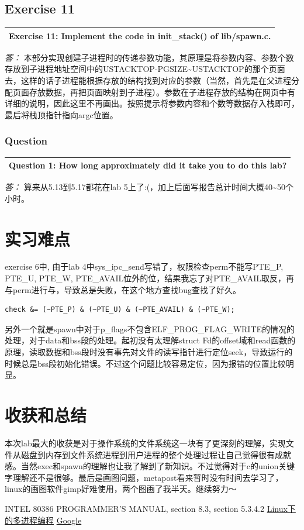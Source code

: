 \documentclass[11pt,a4paper]{article}
\newcommand{\exercise}[2]{
\begin{tabular}{|p{\textwidth}|}
\hline
#1: #2\\
\hline
\end{tabular}
\textit{\large{答：}}}
\begin{document}
\subsection{Exercise 11}
\exercise{Exercise 11}{Implement the code in init\_stack() of lib/spawn.c.}
本部分实现创建子进程时的传递参数功能，其原理是将参数内容、参数个数存放到子进程地址空间中的USTACKTOP-PGSIZE\~{}USTACKTOP的那个页面去，这样的话子进程能根据存放的结构找到对应的参数（当然，首先是在父进程分配页面存放数据，再把页面映射到子进程）。参数在子进程存放的结构在网页中有详细的说明，因此这里不再画出。按照提示将参数内容和个数等数据存入栈即可，最后将栈顶指针指向argc位置。\\

\subsubsection{Question}
\exercise{Question 1}{How long approximately did it take you to do this lab?}
算来从5.13到5.17都花在lab 5上了:(，加上后面写报告总计时间大概40\~{}50个小时。

\section{实习难点}
exercise 6中, 由于lab 4中sys\_ipc\_send写错了，权限检查perm不能写PTE\_P, PTE\_U, PTE\_W, PTE\_AVAIL位外的位，结果我忘了对PTE\_AVAIL取反，再与perm进行与，导致总是失败，在这个地方查找bug查找了好久。
\begin{verbatim}
check &= (~PTE_P) & (~PTE_U) & (~PTE_AVAIL) & (~PTE_W);
\end{verbatim}


另外一个就是spawn中对于p\_flags不包含ELF\_PROG\_FLAG\_WRITE的情况的处理，对于data和bss段的处理。起初没有太理解struct Fd的offset域和read函数的原理，读取数据和bss段时没有事先对文件的读写指针进行定位seek，导致运行的时候总是bss段初始化错误。不过这个问题比较容易定位，因为报错的位置比较明显。\\

\section{收获和总结}
本次lab最大的收获是对于操作系统的文件系统这一块有了更深刻的理解，实现文件从磁盘到内存到文件系统进程到用户进程的整个处理过程让自己觉得很有成就感。当然exec和spawn的理解也让我了解到了新知识。不过觉得对于c的union关键字理解还不是很够。最后是画图问题，metapost看来暂时没有时间去学习了，linux的画图软件gimp好难使用，两个图画了我半天。继续努力～

\begin{thebibliography}{10}
 INTEL 80386 PROGRAMMER'S MANUAL, section 8.3, section 5.3.4.2
 \href{http://linux.chinaunix.net/doc/program/2001-08-21/643.shtml}{Linux下的多进程编程}
 \href{http://www.google.com}{Google}
\end{thebibliography}
\end{document}
